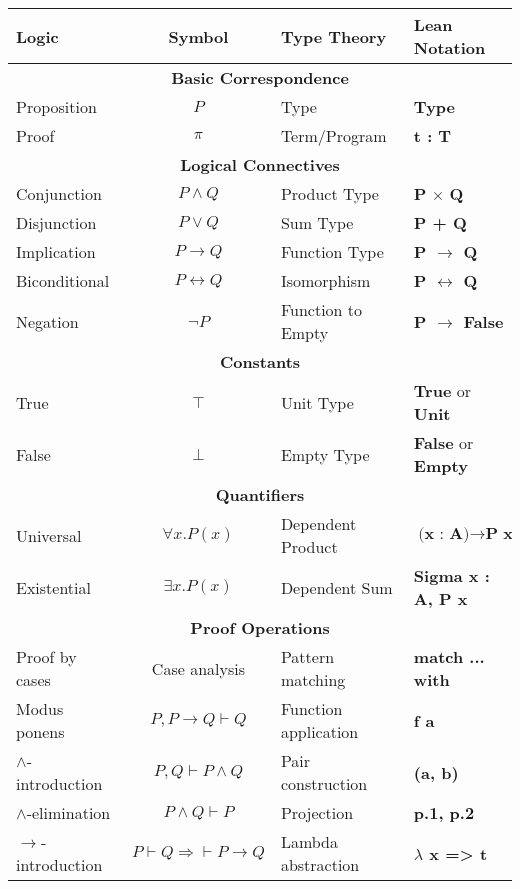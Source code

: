 \begin{table}[htbp]
\begin{tabular}{|l|c|l|l|}
\hline
\textbf{Logic} & \textbf{Symbol} & \textbf{Type Theory} & \textbf{Lean Notation} \\
\hline
\hline
\multicolumn{4}{|c|}{\textbf{Basic Correspondence}} \\
\hline
Proposition & $P$ & Type & \textbf{Type} \\
Proof & $\pi$ & Term/Program & \textbf{t : T} \\
\hline
\hline
\multicolumn{4}{|c|}{\textbf{Logical Connectives}} \\
\hline
Conjunction & $P \land Q$ & Product Type & \textbf{P} $\times$ \textbf{Q} \\
Disjunction & $P \lor Q$ & Sum Type & \textbf{P + Q} \\
Implication & $P \to Q$ & Function Type & \textbf{P $\to$ Q} \\
Biconditional & $P \leftrightarrow Q$ & Isomorphism & \textbf{P $\leftrightarrow$ Q} \\
Negation & $\neg P$ & Function to Empty & \textbf{P $\to$ False} \\
\hline
\hline
\multicolumn{4}{|c|}{\textbf{Constants}} \\
\hline
True & $\top$ & Unit Type & \textbf{True} or \textbf{Unit} \\
False & $\bot$ & Empty Type & \textbf{False} or \textbf{Empty} \\
\hline
\hline
\multicolumn{4}{|c|}{\textbf{Quantifiers}} \\
\hline
Universal & $\forall x. P(x)$ & Dependent Product & $\textbf{(x : A)} \to \textbf{P x}$ \\
Existential & $\exists x. P(x)$ & Dependent Sum & \textbf{Sigma x : A, P x} \\
\multicolumn{4}{|c|}{\textbf{Proof Operations}} \\
\hline
Proof by cases & Case analysis & Pattern matching & \textbf{match ... with} \\
Modus ponens & $P, P \to Q \vdash Q$ & Function application & \textbf{f a} \\
$\land$-introduction & $P, Q \vdash P \land Q$ & Pair construction & \textbf{(a, b)} \\
$\land$-elimination & $P \land Q \vdash P$ & Projection & \textbf{p.1, p.2} \\
$\to$-introduction & $P \vdash Q \Rightarrow \vdash P \to Q$ & Lambda abstraction & \textbf{$\lambda$ x => t} \\
\hline
\end{tabular}
\end{table}

